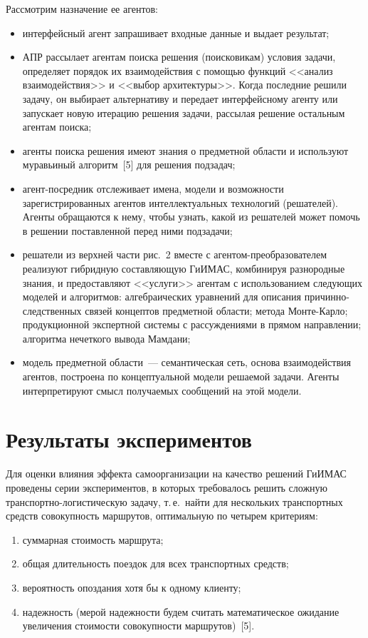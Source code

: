\begin{multicols}{2}
  Рассмотрим назначение ее агентов: 
  \begin{itemize}
\item интерфейсный агент запрашивает входные данные и выдает результат;
\item АПР рассылает агентам поиска решения (поисковикам) условия задачи, 
определяет порядок их взаимодействия с помощью функций <<анализ 
взаимодействия>> и <<выбор архитектуры>>. Когда последние решили задачу, 
он выбирает альтернативу и передает интерфейсному агенту или запускает 
новую итерацию решения задачи, рассылая решение остальным агентам 
поиска;
\item агенты поиска решения имеют знания о предметной области и используют 
муравьиный алгоритм~[5] для решения подзадач;
\item агент-посредник отслеживает имена, модели и возможности 
зарегистрированных агентов интеллектуальных технологий (решателей). 
Агенты обращаются к нему, чтобы узнать, какой из решателей может помочь в 
решении поставленной перед ними подзадачи;
\item решатели из верхней части рис.~2 вместе с 
аген\-том-пре\-обра\-зо\-ва\-те\-лем реализуют гибридную составляющую 
ГиИМАС, комбинируя разнородные знания, и предоставляют <<услуги>> 
агентам с использованием следующих моделей и алгоритмов: алгебраических 
уравнений для описания при\-чин\-но-след\-ст\-вен\-ных связей концептов 
предметной области; метода Мон\-те-Кар\-ло; продукционной экспертной 
системы с рассуждениями в прямом направлении; алгоритма нечеткого вывода 
Мамдани;
\item модель предметной области~--- семантическая сеть, основа 
взаимодействия агентов, по\-стро\-ена по концептуальной модели решаемой 
задачи. Агенты интерпретируют смысл получаемых сообщений на этой модели. 
  \end{itemize}

\section{Результаты экспериментов }

  Для оценки влияния эффекта самоорганизации на качество решений 
ГиИМАС проведены серии экспериментов, в которых требовалось решить 
сложную транс\-порт\-но-ло\-ги\-сти\-че\-скую задачу, т.\,е.\ найти для 
нескольких транспортных средств совокупность маршрутов, оптимальную по 
четырем критериям:
\begin{enumerate}[(1)]
\item суммарная стоимость маршрута; 
\item общая длительность 
поездок для всех транспортных средств; 
\item вероятность опоздания хотя бы к 
одному клиенту; 
\item надежность (мерой надежности будем считать математическое 
ожидание увеличения стоимости совокупности маршрутов)~[5]. 
\end{enumerate}


\end{multicols}
